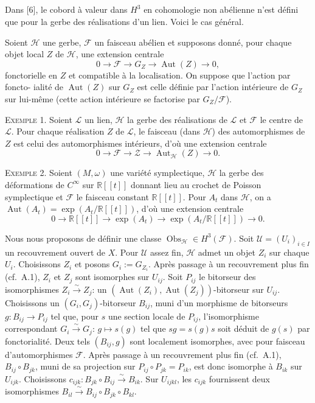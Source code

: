 \documentclass[11pt,a4paper]{article}
\theoremstyle{plain}
\theoremstyle{definition}
\DeclareMathOperator{\Aut}{Aut}
\DeclareMathOperator{\Obs}{Obs}
\newcommand{\R}{\mathbb{R}}
\newcommand{\iso}{\xrightarrow{\sim}}
\begin{document}
\subsection{}
Dans [6], le cobord \`a valeur dans $H^{3}$ en cohomologie non ab\'elienne n'est d\'efini
que pour la gerbe des r\'ealisations d'un lien. Voici le cas g\'en\'eral.

Soient $\mathcal{H}$ une gerbe, $\mathcal{F}$ un faisceau ab\'elien et supposons donn\'e, pour chaque
objet local $Z$ de $\mathcal{H}$, une extension centrale
\begin{equation}
0 \longrightarrow \mathcal{F} \longrightarrow G_{Z} \longrightarrow \Aut(Z) \longrightarrow 0, \tag{A.6.1}
\end{equation}
fonctorielle en $Z$ et compatible \`a la localisation. On suppose que l'action par foncto-
ialit\'e de $\Aut(Z)$ sur $G_{Z}$ est celle d\'efinie par l'action int\'erieure de $G_{Z}$ sur lui-m\^eme
(cette action int\'erieure se factorise par $G_{Z}/\mathcal{F}$).

\noindent \textsc{Exemple 1.} Soient $\mathcal{L}$ un lien, $\mathcal{H}$ la gerbe des r\'ealisations de $\mathcal{L}$ et $\mathcal{F}$ le centre de $\mathcal{L}$.
Pour chaque r\'ealisation $Z$ de $\mathcal{L}$, le faisceau (dans $\mathcal{H}$) des automorphismes de $Z$ est
celui des automorphismes int\'erieurs, d'o\`u une extension centrale
\[
0 \longrightarrow \mathcal{F} \longrightarrow \mathcal{Z} \longrightarrow \Aut_{\mathcal{H}}(Z) \longrightarrow 0.
\]

\noindent \textsc{Exemple 2.} Soient $(M, \omega)$ une vari\'et\'e symplectique, $\mathcal{H}$ la gerbe des d\'eformations de $C^{\infty}$ sur $\R[[t]]$ donnant lieu au crochet de Poisson symplectique et $\mathcal{F}$ le faisceau constant $\R[[t]]$. Pour $A_{t}$ dans $\mathcal{H}$, on a $\Aut(A_{t}) = \exp(A_{t}/\R[[t]])$, d'o\`u une extension centrale
\[
0 \longrightarrow \R[[t]] \longrightarrow \exp(A_{t}) \longrightarrow \exp(A_{t}/\R[[t]]) \longrightarrow 0.
\]

Nous nous proposons de d\'efinir une classe $\Obs_{\mathcal{H}} \in H^{3}(\mathcal{F})$. Soit $\mathcal{U} = (U_{i})_{i \in I}$
un recouvrement ouvert de $X$. Pour $\mathcal{U}$ assez fin, $\mathcal{H}$ admet un objet $Z_{i}$ sur chaque $U_{i}$. Choisissons $Z_{i}$ et posons $G_{i} := G_{Z_{i}}$. Apr\`es passage \`a un recouvrement plus fin (cf.~A.1), $Z_{i}$ et $Z_{j}$ sont isomorphes sur $U_{ij}$. Soit $P_{ij}$ le bitorseur des isomorphismes $Z_{i} \iso Z_{j}$: un $(\Aut(Z_{i}), \Aut(Z_{j}))$-bitorseur sur $U_{ij}$. Choisissons un $(G_{i}, G_{j})$-bitorseur $B_{ij}$, muni d'un morphisme de bitorseurs $g: B_{ij} \to P_{ij}$ tel que, pour $s$ une section locale de $P_{ij}$, l'isomorphisme correspondant $G_{i} \iso G_{j}$: $g \mapsto s(g)$ tel que $sg = s(g)s$ soit d\'eduit de $g(s)$ par fonctorialit\'e. Deux tels $(B_{ij}, g)$ sont localement isomorphes, avec pour faisceau d'automorphismes $\mathcal{F}$. Apr\`es passage \`a un recouvrement plus fin (cf.~A.1), $B_{ij} \circ B_{jk}$, muni de sa projection sur $P_{ij} \circ P_{jk} = P_{ik}$, est donc isomorphe \`a $B_{ik}$ sur $U_{ijk}$. Choisissons $c_{ijk}: B_{jk} \circ B_{ij} \iso B_{ik}$. Sur $U_{ijkl}$, les $c_{ijk}$ fournissent deux isomorphismes $B_{il} \iso B_{ij} \circ B_{jk} \circ B_{kl}$.
\end{document}
